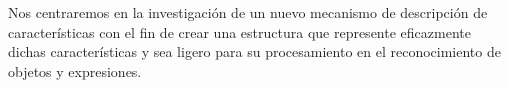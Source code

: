 Nos centraremos en la investigación de un nuevo mecanismo de descripción de características con el fin de crear una estructura que represente eficazmente dichas características y sea ligero para su procesamiento en el reconocimiento de objetos y expresiones.
%
%
%
%
%
%
